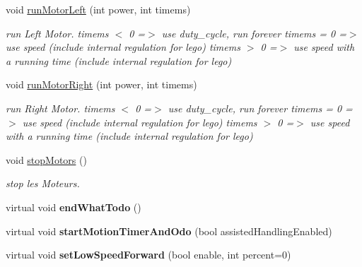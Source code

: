 \begin{DoxyCompactItemize}
\mbox{\label{classAsserv_a1db79355d394b4cb35690bdd6ab3fc2c}} 
void \hyperlink{classAsserv_a1db79355d394b4cb35690bdd6ab3fc2c}{run\+Motor\+Left} (int power, int timems)
\begin{DoxyCompactList}\small\item\em run Left Motor. timems $<$ 0 =$>$ use duty\+\_\+cycle, run forever timems = 0 =$>$ use speed (include internal regulation for lego) timems $>$ 0 =$>$ use speed with a running time (include internal regulation for lego) \end{DoxyCompactList}\item 
\mbox{\label{classAsserv_a0fea807aa7d95a9f9c2b950c03756c09}} 
void \hyperlink{classAsserv_a0fea807aa7d95a9f9c2b950c03756c09}{run\+Motor\+Right} (int power, int timems)
\begin{DoxyCompactList}\small\item\em run Right Motor. timems $<$ 0 =$>$ use duty\+\_\+cycle, run forever timems = 0 =$>$ use speed (include internal regulation for lego) timems $>$ 0 =$>$ use speed with a running time (include internal regulation for lego) \end{DoxyCompactList}\item 
\mbox{\label{classAsserv_ab7cc800e310cb52cbce5aee9f910f261}} 
void \hyperlink{classAsserv_ab7cc800e310cb52cbce5aee9f910f261}{stop\+Motors} ()
\begin{DoxyCompactList}\small\item\em stop les Moteurs. \end{DoxyCompactList}\item 
\mbox{\label{classAsserv_af08c1dab6683da88f3ceda50065e1a3d}} 
virtual void {\bfseries end\+What\+Todo} ()
\item 
\mbox{\label{classAsserv_a366bf4a9f0880c5dc125ac0637fee326}} 
virtual void {\bfseries start\+Motion\+Timer\+And\+Odo} (bool assisted\+Handling\+Enabled)
\item 
\mbox{\label{classAsserv_a3ee97758e6496987ec5c84f084a3d3aa}} 
virtual void {\bfseries set\+Low\+Speed\+Forward} (bool enable, int percent=0)
\item 
\mbox{\label{classAsserv_a21b2a90179e065b7e48e364dd41b0d02}} 

\end{DoxyCompactItemize}
